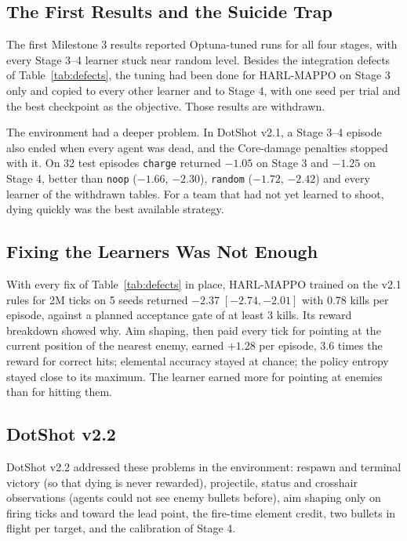 \documentclass[11pt]{article}
\begin{document}
\subsection{The First Results and the Suicide Trap}

The first Milestone 3 results reported Optuna-tuned runs for all four stages, with every Stage 3--4 learner stuck near random level. Besides the integration defects of Table~\ref{tab:defects}, the tuning had been done for HARL-MAPPO on Stage 3 only and copied to every other learner and to Stage 4, with one seed per trial and the best checkpoint as the objective. Those results are withdrawn.

The environment had a deeper problem. In DotShot v2.1, a Stage 3--4 episode also ended when every agent was dead, and the Core-damage penalties stopped with it. On 32 test episodes \texttt{charge} returned $-1.05$ on Stage 3 and $-1.25$ on Stage 4, better than \texttt{noop} ($-1.66$, $-2.30$), \texttt{random} ($-1.72$, $-2.42$) and every learner of the withdrawn tables. For a team that had not yet learned to shoot, dying quickly was the best available strategy.

\subsection{Fixing the Learners Was Not Enough}

With every fix of Table~\ref{tab:defects} in place, HARL-MAPPO trained on the v2.1 rules for 2M ticks on 5 seeds returned $-2.37\;[-2.74, -2.01]$ with 0.78 kills per episode, against a planned acceptance gate of at least 3 kills. Its reward breakdown showed why. Aim shaping, then paid every tick for pointing at the current position of the nearest enemy, earned $+1.28$ per episode, 3.6 times the reward for correct hits; elemental accuracy stayed at chance; the policy entropy stayed close to its maximum. The learner earned more for pointing at enemies than for hitting them.

\subsection{DotShot v2.2}

DotShot v2.2 addressed these problems in the environment: respawn and terminal victory (so that dying is never rewarded), projectile, status and crosshair observations (agents could not see enemy bullets before), aim shaping only on firing ticks and toward the lead point, the fire-time element credit, two bullets in flight per target, and the calibration of Stage 4.
\end{document}
